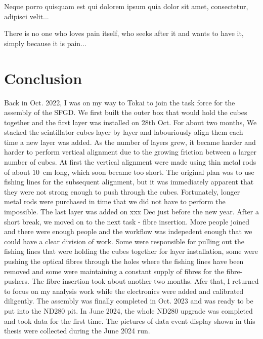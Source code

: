 \begin{savequote}[8cm]
\textlatin{Neque porro quisquam est qui dolorem ipsum quia dolor sit amet, consectetur, adipisci velit...}

There is no one who loves pain itself, who seeks after it and wants to have it, simply because it is pain...
\end{savequote}

\chapter{\label{ch:1-concl}Conclusion} 

\minitoc

Back in Oct. 2022, I was on my way to Tokai to join the task force for the assembly of the SFGD.
We first built the outer box that would hold the cubes together and the first layer was installed on 28th Oct.
For about two months, We stacked the scintillator cubes layer by layer and labouriously align them each time a new layer was added.
As the number of layers grew, it became harder and harder to perform vertical alignment due to the growing friction between a larger number of cubes.
At first the vertical alignment were made using thin metal rods of about $10$~cm long, which soon became too short.
The original plan was to use fishing lines for the subsequent alignment, but it was immediately apparent that they were not strong enough to push through the cubes.
Fortunately, longer metal rods were purchased in time that we did not have to perform the impossible.
The last layer was added on xxx Dec just before the new year.
After a short break, we moved on to the next task - fibre insertion.
More people joined and there were enough people and the workflow was indepedent enough that we could have a clear division of work.
Some were responsible for pulling out the fishing lines that were holding the cubes together for layer installation, some were pushing the optical fibres through the holes where the fishing lines have been removed and some were maintaining a constant supply of fibres for the fibre-pushers.
The fibre insertion took about another two months.
Afer that, I returned to focus on my analysis work while the electronics were added and calibrated diligently.
The assembly was finally completed in Oct. 2023 and was ready to be put into the ND280 pit.
In June 2024, the whole ND280 upgrade was completed and took data for the first time.
The pictures of data event display shown in this thesis were collected during the June 2024 run.

